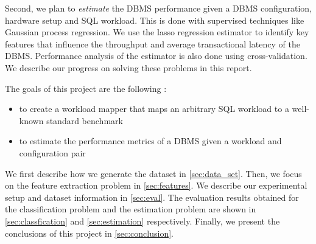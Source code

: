 Second, we plan to \textit{estimate} the DBMS performance given a 
DBMS configuration, hardware setup and SQL workload. 
This is done with supervised techniques like 
Gaussian process regression.
We use the lasso regression estimator to identify key features 
that influence the throughput and average transactional latency 
of the DBMS.
Performance analysis of the estimator is also done using 
cross-validation.
We describe our progress on solving these problems in this report.

The goals of this project are the following : 
\begin{itemize}
  	\item to create a workload mapper that maps an arbitrary SQL workload to a
well-known standard benchmark
	\item to estimate the performance metrics of a DBMS given a workload and
configuration pair
\end{itemize}

We first describe how we generate the dataset in \cref{sec:data_set}. 
Then, we focus on the feature extraction problem in \cref{sec:features}.
We describe our experimental setup and dataset information in
\cref{sec:eval}. The evaluation results obtained for the classification
problem and the estimation problem are shown in \cref{sec:classfication}
and \cref{sec:estimation} respectively. Finally, we present the 
conclusions of this project in \cref{sec:conclusion}.